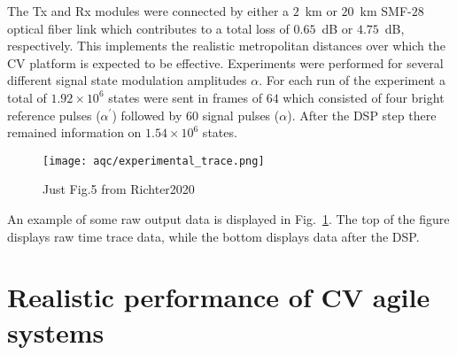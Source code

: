 The Tx and Rx modules were connected by either a $2$~km or $20$~km SMF-$28$ optical fiber link which contributes to a total loss of $0.65$~dB or $4.75$~dB, respectively. This implements the realistic metropolitan distances over which the CV platform is expected to be effective. Experiments were performed for several different signal state modulation amplitudes $\alpha$. For each run of the experiment a total of $1.92\times 10^6$ states were sent in frames of $64$ which consisted of four bright reference pulses ($\alpha^\prime$) followed by $60$ signal pulses ($\alpha$). After the DSP step there remained information on $1.54 \times 10^6$ states. 

\begin{figure}[htp]
\centering
\texttt{[image: aqc/experimental\_trace.png]}
\caption{\label{fig:aqc_experimental_trace} Just Fig.5 from Richter2020}
\end{figure}

An example of some raw output data is displayed in Fig.~\ref{fig:aqc_experimental_trace}. The top of the figure displays raw time trace data, while the bottom displays data after the DSP.

\section{Realistic performance of CV agile systems}




